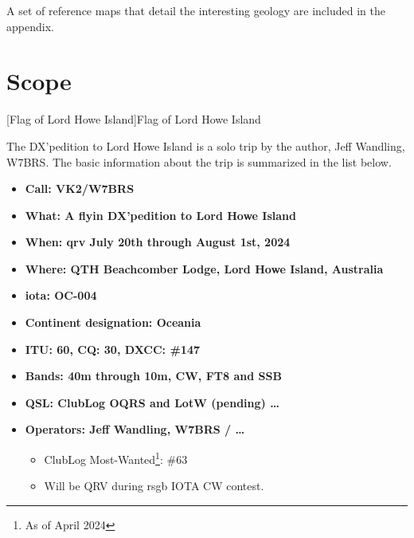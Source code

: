\documentclass[11pt]{article}
\begin{document}
A set of reference maps that detail the interesting geology are included
in the appendix.


\section{Scope}

\vskip2mm
\noindent%
\begin{minipage}{\linewidth}%
\captionsetup{width=0.8\linewidth}
[Flag of Lord Howe Island]{Flag of Lord Howe Island}
\label{flag}
\end{minipage}
\vskip5mm

The DX'pedition to Lord Howe Island is a solo trip by the author, Jeff
Wandling, W7BRS.  The basic information about the trip is summarized
in the list below.

\begin{itemize}
\item {\textbf{Call: VK2/W7BRS}}
\item {\textbf{What: A {\gls{flyin}} DX'pedition to Lord Howe Island}}
\item {\textbf{When: {\gls{qrv}} July 20th through August 1st, 2024}}
\item {\textbf{Where: QTH Beachcomber Lodge, Lord Howe Island, Australia}}
\item {\textbf{{\gls{iota}}: OC-004}}
\item {\textbf{Continent designation: Oceania}}
\item {\textbf{ITU: 60, CQ: 30, DXCC: \#147}}
\item {\textbf{Bands: 40m through 10m, CW, FT8 and SSB}}
\item {\textbf{QSL: ClubLog OQRS and LotW (pending)  \ldots}}
\item {\textbf{Operators: Jeff Wandling, W7BRS /  \ldots}}
\begin{itemize}
    \item ClubLog Most-Wanted\footnote{As of April 2024}: \#63
    \item Will be QRV during {\gls{rsgb}} IOTA CW contest.
\end{itemize}
\end{itemize}
\par
\end{document}
